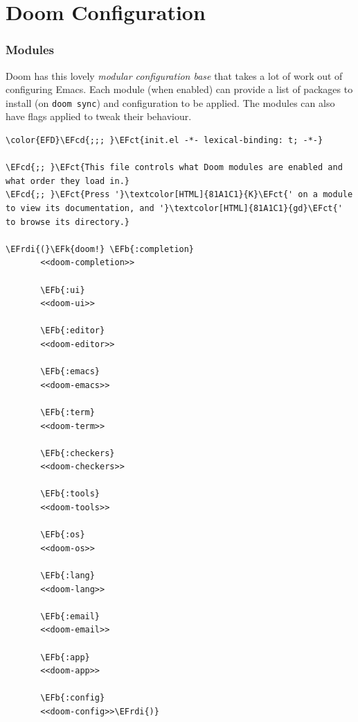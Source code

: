 \documentclass{scrartcl}
\newcommand{\EFk}[1]{\textcolor{EFk}{#1}} %
\newcommand{\EFb}[1]{\textcolor{EFb}{#1}} %
\newcommand{\EFct}[1]{\textcolor{EFct}{#1}} %
\newcommand{\EFcd}[1]{\textcolor{EFcd}{#1}} %
\newcommand{\EFrdi}[1]{#1} %
\begin{document}
\section{Doom Configuration}
\label{sec:orgd90883d}
\subsubsection{Modules}
\label{sec:org902f8bd}
Doom has this lovely \emph{modular configuration base} that takes a lot of work out of
configuring Emacs. Each module (when enabled) can provide a list of packages to
install (on \texttt{doom sync}) and configuration to be applied. The modules can also
have flags applied to tweak their behaviour.

\begin{Code}
\begin{Verbatim}[]
\color{EFD}\EFcd{;;; }\EFct{init.el -*- lexical-binding: t; -*-}

\EFcd{;; }\EFct{This file controls what Doom modules are enabled and what order they load in.}
\EFcd{;; }\EFct{Press '}\textcolor[HTML]{81A1C1}{K}\EFct{' on a module to view its documentation, and '}\textcolor[HTML]{81A1C1}{gd}\EFct{' to browse its directory.}

\EFrdi{(}\EFk{doom!} \EFb{:completion}
       <<doom-completion>>

       \EFb{:ui}
       <<doom-ui>>

       \EFb{:editor}
       <<doom-editor>>

       \EFb{:emacs}
       <<doom-emacs>>

       \EFb{:term}
       <<doom-term>>

       \EFb{:checkers}
       <<doom-checkers>>

       \EFb{:tools}
       <<doom-tools>>

       \EFb{:os}
       <<doom-os>>

       \EFb{:lang}
       <<doom-lang>>

       \EFb{:email}
       <<doom-email>>

       \EFb{:app}
       <<doom-app>>

       \EFb{:config}
       <<doom-config>>\EFrdi{)}
\end{Verbatim}
\end{Code}
\end{document}
